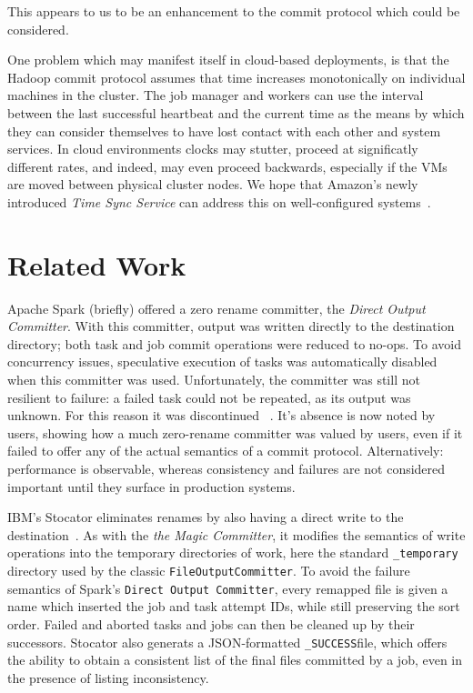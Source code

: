 \documentclass[conference]{IEEEtran}
\newcommand{\SUCCESS}{\texttt{\_SUCCESS}}
\begin{document}
This appears to us to be an enhancement to the commit protocol which could
be considered.


One problem which may manifest itself in cloud-based deployments,
is that the Hadoop commit protocol assumes that time increases monotonically
on individual machines in the cluster.
The job manager and workers can use the interval between the last successful heartbeat
and the current time as the means by which they can consider themselves to have lost
contact with each other and system services.
In cloud environments clocks may stutter, proceed at significatly different rates,
and indeed, may even proceed backwards, especially if the VMs are moved between
physical cluster nodes.
We hope that Amazon's newly introduced \emph{Time Sync Service}
can address this on well-configured systems\ \cite{AWS-clock-service}.



\section{Related Work}
\label{sec:relatedWork}

Apache Spark (briefly) offered a zero rename committer,
the \emph{Direct Output Committer}.
With this committer, output was written directly to the destination directory;
both task and job commit operations were reduced to no-ops.
To avoid concurrency issues, speculative execution of tasks was automatically
disabled when this committer was used.
Unfortunately, the committer was still not resilient to failure: a failed
task could not be repeated, as its output was unknown.
For this reason it was discontinued \ \cite{SPARK-10063}.
It's absence is now noted by users, showing how a much zero-rename committer
was valued by users, even if it failed to offer any of the actual semantics
of a commit protocol.
Alternatively: performance is observable, whereas consistency and failures
are not considered important until they surface in production systems.

IBM's Stocator eliminates renames by also having a direct write to the
destination\ \cite{Stocator}.
As with the \emph{the Magic Committer}, it modifies the semantics of write
operations into the temporary directories of work, here the standard
\texttt{\_temporary} directory used by the classic \texttt{FileOutputCommitter}.
To avoid the failure semantics of Spark's \texttt{Direct Output Committer},
every remapped file is given a name which inserted the job and task attempt IDs,
while still preserving the sort order.
Failed and aborted tasks and jobs can then be cleaned up by their successors.
Stocator also generats a JSON-formatted \SUCCESS file, which offers
the ability to obtain a consistent list of the final files committed by a job,
even in the presence of listing inconsistency.
\end{document}
